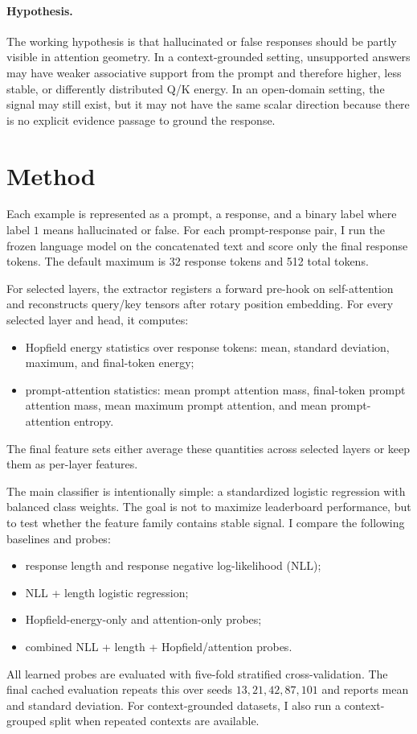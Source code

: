 \documentclass{article}
\begin{document}
\paragraph{Hypothesis.}
The working hypothesis is that hallucinated or false responses should be partly visible in attention
geometry. In a context-grounded setting, unsupported answers may have weaker associative support
from the prompt and therefore higher, less stable, or differently distributed Q/K energy. In an
open-domain setting, the signal may still exist, but it may not have the same scalar direction because
there is no explicit evidence passage to ground the response.

\section{Method}

Each example is represented as a prompt, a response, and a binary label where label $1$ means
hallucinated or false. For each prompt-response pair, I run the frozen language model on the
concatenated text and score only the final response tokens. The default maximum is 32 response
tokens and 512 total tokens.

For selected layers, the extractor registers a forward pre-hook on self-attention and reconstructs
query/key tensors after rotary position embedding. For every selected layer and head, it computes:
\begin{itemize}
    \item Hopfield energy statistics over response tokens: mean, standard deviation, maximum, and
    final-token energy;
    \item prompt-attention statistics: mean prompt attention mass, final-token prompt attention mass,
    mean maximum prompt attention, and mean prompt-attention entropy.
\end{itemize}
The final feature sets either average these quantities across selected layers or keep them as
per-layer features.

The main classifier is intentionally simple: a standardized logistic regression with balanced class
weights. The goal is not to maximize leaderboard performance, but to test whether the feature family
contains stable signal. I compare the following baselines and probes:
\begin{itemize}
    \item response length and response negative log-likelihood (NLL);
    \item NLL + length logistic regression;
    \item Hopfield-energy-only and attention-only probes;
    \item combined NLL + length + Hopfield/attention probes.
\end{itemize}
All learned probes are evaluated with five-fold stratified cross-validation. The final cached
evaluation repeats this over seeds $13, 21, 42, 87, 101$ and reports mean and standard deviation.
For context-grounded datasets, I also run a context-grouped split when repeated contexts are
available.
\end{document}
